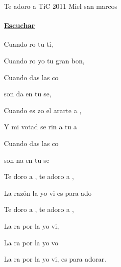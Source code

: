 \documentclass[12pt, spanish]{book}
\newcommand{\NotCCLIed}{\relax}
\begin{document}
    \begin{song}{Te adoro a Tí}{C}
        {2011} %
        {Miel san marcos}
        {} %
        {} %
        \ifChordBk
            \paragraph{\mbox{}\hfill\protect\href{https://open.spotify.com/intl-es/track/4lCeWULfgRQ2n632zfh9AC}{Escuchar}\mbox{}\hfill}
        \fi

        \begin{SBOpGroup}
            Cuando ro tu ti,

            Cuando ro yo tu gran bon,

            Cuando das las co

            son da en tu   se,

            Cuando es zo el ararte a ,

            Y mi votad se rin a tu a

            Cuando das las co

            son na en tu   se
        \end{SBOpGroup}
        \vskip 20pt
        \begin{SBOpGroup}
            Te doro a ,      te adoro a ,

            La razón  la  yo vi es para ado

            Te doro a ,      te adoro a ,

            La ra por la  yo vi,

            La ra por la  yo vo

            La ra por la  yo vi, es para adorar.
        \end{SBOpGroup}


\end{song}
\end{document}
